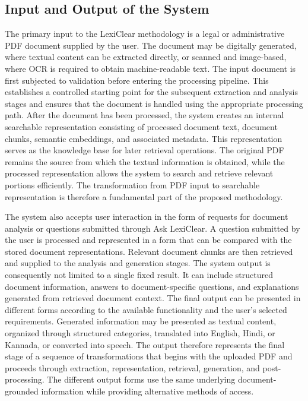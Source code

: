 \documentclass[12pt,a4paper,oneside]{report}
\begin{document}
\subsection{Input and Output of the System}

The primary input to the LexiClear methodology is a legal or administrative
PDF document supplied by the user. The document may be digitally generated,
where textual content can be extracted directly, or scanned and
image-based, where OCR is required to obtain machine-readable text. The
input document is first subjected to validation before entering the
processing pipeline. This establishes a controlled starting point for the
subsequent extraction and analysis stages and ensures that the document is
handled using the appropriate processing path. After the document has been processed, the system creates an internal
searchable representation consisting of processed document text, document
chunks, semantic embeddings, and associated metadata. This representation
serves as the knowledge base for later retrieval operations. The original
PDF remains the source from which the textual information is obtained,
while the processed representation allows the system to search and retrieve
relevant portions efficiently. The transformation from PDF input to
searchable representation is therefore a fundamental part of the proposed
methodology.

The system also accepts user interaction in the form of requests for
document analysis or questions submitted through Ask LexiClear. A question
submitted by the user is processed and represented in a form that can be
compared with the stored document representations. Relevant document chunks
are then retrieved and supplied to the analysis and generation stages. The
system output is consequently not limited to a single fixed result. It can
include structured document information, answers to document-specific
questions, and explanations generated from retrieved document context. The final output can be presented in different forms according to the
available functionality and the user's selected requirements. Generated
information may be presented as textual content, organized through
structured categories, translated into English, Hindi, or Kannada, or
converted into speech. The output therefore represents the final stage of a
sequence of transformations that begins with the uploaded PDF and proceeds
through extraction, representation, retrieval, generation, and
post-processing. The different output forms use the same underlying
document-grounded information while providing alternative methods of access.
\end{document}
